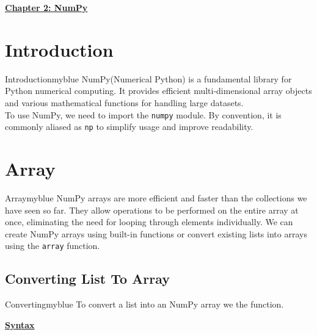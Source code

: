 \newpage
\begin{center}
    \Huge{\textbf{\underline{Chapter 2: NumPy}}}
\end{center}

\setcounter{section}{0}

\section{Introduction}
\begin{prettyBox}{Introduction}{myblue}
NumPy(Numerical Python) is a fundamental library for Python 
numerical computing. It provides efficient multi-dimensional 
array objects and various mathematical functions for handling 
large datasets.\\[0.1cm]
To use NumPy, we need to import the \texttt{numpy} module. By 
convention, it is commonly aliased as \texttt{np} to simplify usage 
and improve readability.
\end{prettyBox}

\vspace{0.5cm}

\section{Array}
\begin{prettyBox}{Array}{myblue}  
NumPy arrays are more efficient and faster than the collections we have seen so far. They 
allow operations to be performed on the entire array at once, eliminating the need for looping 
through elements individually. We can create NumPy arrays using built-in functions or convert 
existing lists into arrays using the \texttt{array} function.  
\end{prettyBox}

\vspace{0.5cm}
\subsection{Converting List To Array}
\begin{prettyBox}{Converting}{myblue}
To convert a list into an NumPy array we the  function.
\end{prettyBox}

\vspace{1cm}
\textbf{\underline{Syntax}}\\[0.1cm]


\vspace{0.5cm}

